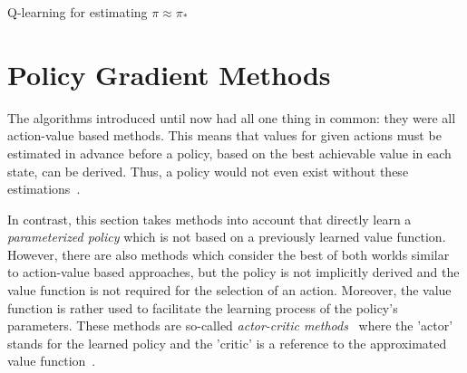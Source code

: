 \documentclass[draft,final]{vutinfth} %
\newcommand{\p}[1]{see p. #1}
\begin{document}
    \begin{algorithm}
        \caption[Q-learning for estimating $\pi \approx \pi_*$]{Q-learning for estimating $\pi \approx \pi_*$\protect\footnotemark}
        \label{alg:q_learning}

        \KwIn{Step size $\alpha \in (0,1]$, small $\epsilon > 0$}
        \;



    \end{algorithm}

    \footnotetext{\citep[\p{131}]{sutton_reinforcement_2018}}


    \section{Policy Gradient Methods}\label{sec:policy-gradient-methods}
    The algorithms introduced until now had all one thing in common: they were all action-value based methods.
    This means that values for given actions must be estimated in advance before a policy, based on the best achievable value in each state, can be derived.
    Thus, a policy would not even exist without these estimations~\citep[\p{321}]{sutton_reinforcement_2018}.

    In contrast, this section takes methods into account that directly learn a \textit{parameterized policy} which is not based on a previously learned value function.
    However, there are also methods which consider the best of both worlds similar to action-value based approaches, but the policy is not implicitly derived and the value function is not required for the selection of an action.
    Moreover, the value function is rather used to facilitate the learning process of the policy's parameters.
    These methods are so-called \textit{actor-critic methods}~ where the 'actor' stands for the learned policy and the 'critic' is a reference to the approximated value function~\citep[\p{321}]{sutton_reinforcement_2018}.
\end{document}
